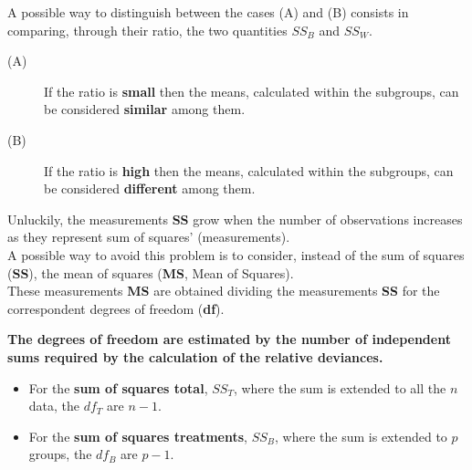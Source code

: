 \begin{frame}
  \vspace*{.25cm}
  A possible way to distinguish between the cases (A) and (B) consists in comparing, through their ratio, the two quantities {\boldmath$SS_B$} and {\boldmath$SS_W$}.
  \vspace*{.5cm}
  \hspace*{-.5cm}
  \begin{description}
    \item[(A)] If the ratio is \textbf{small} then the means, calculated within the subgroups, can be considered \textbf{similar} among them.
    \vspace*{.5cm}
    \item[(B)] If the ratio is \textbf{high} then the means, calculated within the subgroups, can be considered \textbf{different} among them.
  \end{description}
\end{frame}

\begin{frame}
  \vspace*{.25cm}
  Unluckily, the measurements \textbf{SS} grow when the number of observations increases as they represent sum of squares' (measurements).\\
  \vspace*{.5cm}
  A possible way to avoid this problem is to consider, instead of the sum of squares (\textbf{SS}), the mean of squares (\textbf{MS}, Mean of Squares).\\
  \vspace*{.5cm}
  These measurements \textbf{MS} are obtained dividing the measurements \textbf{SS} for the correspondent degrees of freedom (\textbf{df}).
\end{frame}

\begin{frame}
  \vspace*{.5cm}
  \textbf{The degrees of freedom are estimated by the number of independent sums required by the calculation of the relative deviances.}
  \vspace*{.5cm}
  \begin{itemize}
    \item For the \textbf{sum of squares total}, {\boldmath$SS_T$}, where the sum is extended to all the $ n $ data, the {\boldmath$df_T$} are {\boldmath $ n-1 $}.
    \vspace*{.5cm}
    \item For the \textbf{sum of squares treatments}, {\boldmath$SS_B$}, where the sum is extended to $ p $ groups, the {\boldmath$df_B$} are {\boldmath $ p-1 $}.
  \end{itemize}
\end{frame}


